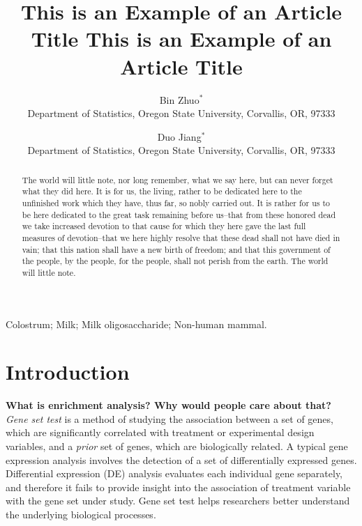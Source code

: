 \documentclass[useAMS,usenatbib, galley]{biom}
\title[This is an Example of Recto Running Head]{This is an Example of
an Article Title This is an Example of an Article Title}
\author{Bin Zhuo$^{*}$\email{zhuob@oregonstate.edu} \\
	   Department of Statistics, Oregon State University, Corvallis, OR, 97333
	   \and 
	   Duo Jiang$^{*}$\email{email1aa@address.com}\\
	    Department of Statistics, Oregon State University, Corvallis, OR, 97333
	   }
\begin{document}




\label{firstpage}


\begin{abstract}
The world will little note, nor long remember, what we say here, but
can never forget what they did here. It is for us, the living, rather
to be dedicated here to the unfinished work which they have, thus far,
so nobly carried out. It is rather for us to be here dedicated to the
great task remaining before us--that from these honored dead we take
increased devotion to that cause for which they here gave the last
full measures of devotion--that we here highly resolve that these dead
shall not have died in vain; that this nation shall have a new birth
of freedom; and that this government of the people, by the people, for
the people, shall not perish from the earth. The world will little
note.
\end{abstract}

%
%

\begin{keywords}
Colostrum; Milk; Milk oligosaccharide; Non-human mammal.
\end{keywords}

\maketitle

	\section{Introduction}\label{section:introduction}
	
	\textbf{What is enrichment analysis? Why would people care about that?}\\
	\textit{Gene set test} is a method of studying the association between a set of genes, which are significantly correlated with treatment or experimental design variables, and a \textit{prior} set of genes, which are biologically related. A typical gene expression analysis involves the detection of a set of differentially expressed genes. Differential expression (DE) analysis  evaluates each individual gene separately, and therefore it fails to provide insight into the association of treatment variable with the gene set under study. Gene set test helps researchers better understand the underlying biological processes.
	
\end{document}

